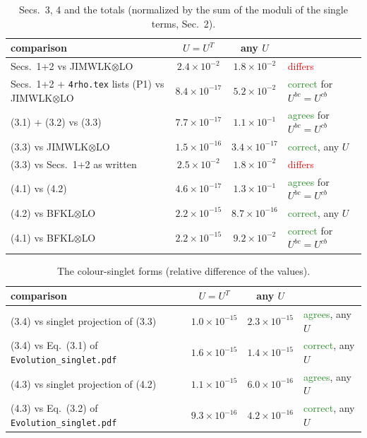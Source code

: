 \documentclass[10pt]{article}
\numberwithin{equation}{section}
\newcommand{\ok}{\textcolor{ForestGreen}{correct}}
\begin{document}
\begin{table}[H]\centering\small
\caption{Secs.~3, 4 and the totals (normalized by the sum of the moduli of the single terms, Sec.~2).}\label{tab:s34}
\begin{tabular}{@{}lccl@{}}\toprule
comparison & $U=U^T$ & any $U$ & \\\midrule
Secs.~1+2 vs JIMWLK$\otimes$LO & $2.4\times10^{-2}$ & $1.8\times10^{-2}$ & \textcolor{red}{differs}\\
Secs.~1+2 + \texttt{4rho.tex} lists (P1) vs JIMWLK$\otimes$LO & $8.4\times10^{-17}$ & $5.2\times10^{-2}$ & \ok{} for $U^{bc}=U^{cb}$\\
\midrule
(3.1) + (3.2) vs (3.3) & $7.7\times10^{-17}$ & $1.1\times10^{-1}$ & \textcolor{ForestGreen}{agrees} for $U^{bc}=U^{cb}$\\
(3.3) vs JIMWLK$\otimes$LO & $1.5\times10^{-16}$ & $3.4\times10^{-17}$ & \ok{}, any $U$\\
(3.3) vs Secs.~1+2 as written & $2.5\times10^{-2}$ & $1.8\times10^{-2}$ & \textcolor{red}{differs}\\
\midrule
(4.1) vs (4.2) & $4.6\times10^{-17}$ & $1.3\times10^{-1}$ & \textcolor{ForestGreen}{agrees} for $U^{bc}=U^{cb}$\\
(4.2) vs BFKL$\otimes$LO & $2.2\times10^{-15}$ & $8.7\times10^{-16}$ & \ok{}, any $U$\\
(4.1) vs BFKL$\otimes$LO & $2.2\times10^{-15}$ & $9.2\times10^{-2}$ & \ok{} for $U^{bc}=U^{cb}$\\
\bottomrule
\end{tabular}
\end{table}

\begin{table}[H]\centering\small
\caption{The colour-singlet forms (relative difference of the values).}\label{tab:sing}
\begin{tabular}{@{}lccl@{}}\toprule
comparison & $U=U^T$ & any $U$ & \\\midrule
(3.4) vs singlet projection of (3.3) & $1.0\times10^{-15}$ & $2.3\times10^{-15}$ & \textcolor{ForestGreen}{agrees}, any $U$\\
(3.4) vs Eq.~(3.1) of \texttt{Evolution\_singlet.pdf} & $1.6\times10^{-15}$ & $1.4\times10^{-15}$ & \ok{}, any $U$\\
(4.3) vs singlet projection of (4.2) & $1.1\times10^{-15}$ & $6.0\times10^{-16}$ & \textcolor{ForestGreen}{agrees}, any $U$\\
(4.3) vs Eq.~(3.2) of \texttt{Evolution\_singlet.pdf} & $9.3\times10^{-16}$ & $4.2\times10^{-16}$ & \ok{}, any $U$\\
\bottomrule
\end{tabular}
\end{table}
\end{document}

